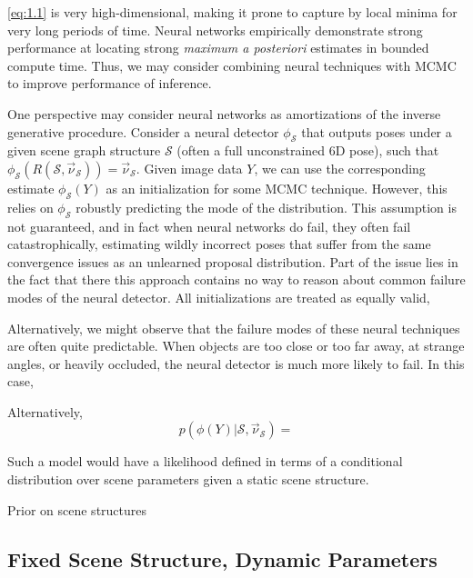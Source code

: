     \ref{eq:1.1} is very high-dimensional, making it prone to capture by local
    minima for very long periods of time. Neural networks empirically demonstrate
    strong performance at locating strong \textit{maximum a posteriori} estimates
    in bounded compute time. Thus, we may consider combining neural techniques
    with MCMC to improve performance of inference.
    
    One perspective may consider neural networks as amortizations of the
    inverse generative procedure. Consider a neural detector $\phi_\mathcal{S}$
    that outputs poses under a given scene graph structure $\mathcal{S}$ (often
    a full unconstrained 6D pose), such that $\phi_\mathcal{S}(R(\mathcal{S},
    \vec{\nu}_\mathcal{S})) = \vec{\nu}_\mathcal{S}$. Given image data $Y$, we
    can use the corresponding estimate $\phi_\mathcal{S}(Y)$ as an
    initialization for some MCMC technique. However, this relies on
    $\phi_\mathcal{S}$ robustly predicting the mode of the distribution. This
    assumption is not guaranteed, and in fact when neural networks do fail,
    they often fail catastrophically, estimating wildly incorrect poses that
    suffer from the same convergence issues as an unlearned proposal
    distribution. Part of the issue lies in the fact that there this approach
    contains no way to reason about common failure modes of the neural detector.
    All initializations are treated as equally valid, 

    Alternatively, we might observe that the failure modes of these neural
    techniques are often quite predictable. When objects are too close or too
    far away, at strange angles, or heavily occluded, the neural detector is
    much more likely to fail. In this case, 

    Alternatively, 
    \[
      p(\phi(Y) | \mathcal{S}, \vec{\nu}_\mathcal{S}) = 
    \]

    Such a model would have a likelihood defined in terms of a conditional distribution
    over scene parameters given a static scene structure.

    Prior on scene structures

  \subsection{Fixed Scene Structure, Dynamic Parameters}

